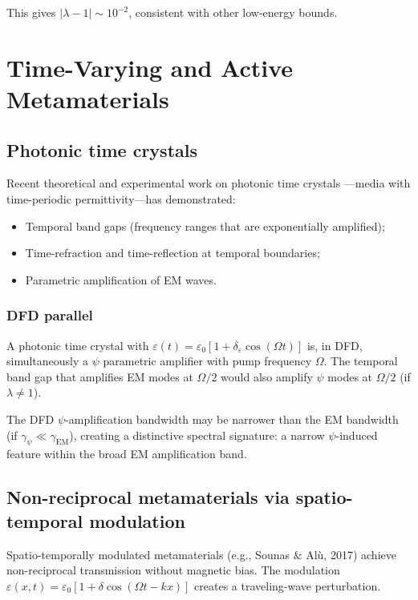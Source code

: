 \documentclass[12pt,letterpaper]{article}
\begin{document}
This gives $|\lambda - 1| \sim 10^{-2}$, consistent with other
low-energy bounds.

\section{Time-Varying and Active Metamaterials}

\subsection{Photonic time crystals}

Recent theoretical and experimental work on photonic time crystals
---media with time-periodic permittivity---has demonstrated:
\begin{itemize}[noitemsep]
  \item Temporal band gaps (frequency ranges that are exponentially
    amplified);
  \item Time-refraction and time-reflection at temporal boundaries;
  \item Parametric amplification of EM waves.
\end{itemize}

\subsubsection{DFD parallel}

A photonic time crystal with $\varepsilon(t) = \varepsilon_0[1 +
\delta_\varepsilon\cos(\Omega t)]$ is, in DFD, simultaneously a
$\psi$ parametric amplifier with pump frequency $\Omega$.  The temporal
band gap that amplifies EM modes at $\Omega/2$ would also amplify
$\psi$ modes at $\Omega/2$ (if $\lambda \neq 1$).

The DFD $\psi$-amplification bandwidth may be narrower than the EM
bandwidth (if $\gamma_\psi \ll \gamma_{\text{EM}}$), creating a
distinctive spectral signature: a narrow $\psi$-induced feature
within the broad EM amplification band.

\subsection{Non-reciprocal metamaterials via spatio-temporal modulation}

Spatio-temporally modulated metamaterials (e.g., Sounas \& Al\`u, 2017)
achieve non-reciprocal transmission without magnetic bias.  The
modulation $\varepsilon(x,t) = \varepsilon_0[1 + \delta\cos(\Omega t -
kx)]$ creates a traveling-wave perturbation.
\end{document}
